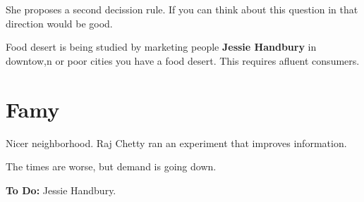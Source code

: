 \documentclass[11pt]{article}
\begin{document}
She proposes a second decission rule. If you can think about this question in that direction would be good. 

Food desert is being studied by marketing people \textbf{Jessie Handbury} in downtow,n or poor cities you have a food desert. This requires afluent consumers.


\section{Famy}

Nicer neighborhood. Raj Chetty ran an experiment that improves information. 

The times are worse, but demand is going down. 

\textbf{To Do:} Jessie Handbury. 




\end{document}
